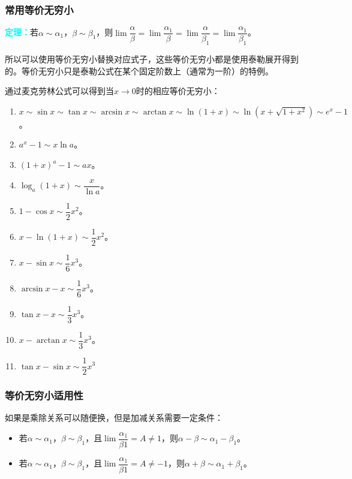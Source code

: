 \documentclass[UTF8, 12pt]{ctexart}
\begin{document}
        \subsubsection{常用等价无穷小}

        \textcolor{aqua}{\textbf{定理：}}若$\alpha\sim\alpha_1$，$\beta\sim\beta_1$，则$\lim\dfrac{\alpha}{\beta}=\lim\dfrac{\alpha_1}{\beta}=\lim\dfrac{\alpha}{\beta_1}=\lim\dfrac{\alpha_1}{\beta_1}$。

        所以可以使用等价无穷小替换对应式子，这些等价无穷小都是使用泰勒展开得到的。等价无穷小只是泰勒公式在某个固定阶数上（通常为一阶）的特例。

        通过麦克劳林公式可以得到当$x\to 0$时的相应等价无穷小：

        \begin{enumerate}
            \item $x\sim\sin x\sim\tan x\sim\arcsin x\sim\arctan x\sim\ln(1+x)\sim\ln(x+\sqrt{1+x^2})\sim e^x-1$。
            \item $a^x-1\sim x\ln a$。
            \item $(1+x)^a-1\sim ax$。
            \item $\log_a(1+x)\sim\dfrac{x}{\ln a}$。
            \item $1-\cos x\sim\dfrac{1}{2}x^2$。
            \item $x-\ln(1+x)\sim\dfrac{1}{2}x^2$。
            \item $x-\sin x\sim\dfrac{1}{6}x^3$。
            \item $\arcsin x-x\sim\dfrac{1}{6}x^3$。
            \item $\tan x-x\sim\dfrac{1}{3}x^3$。
            \item $x-\arctan x\sim\dfrac{1}{3}x^3$。
            \item $\tan x-\sin x\sim\dfrac{1}{2}x^3$
        \end{enumerate}

        \subsubsection{等价无穷小适用性}

        如果是乘除关系可以随便换，但是加减关系需要一定条件：

        \begin{itemize}
            \item 若$\alpha\sim\alpha_1$，$\beta\sim\beta_1$，且$\lim\dfrac{\alpha_1}{\beta 1}=A\neq1$，则$\alpha-\beta\sim\alpha_1-\beta_1$。
            \item 若$\alpha\sim\alpha_1$，$\beta\sim\beta_1$，且$\lim\dfrac{\alpha_1}{\beta 1}=A\neq-1$，则$\alpha+\beta\sim\alpha_1+\beta_1$。
        \end{itemize}
\end{document}
